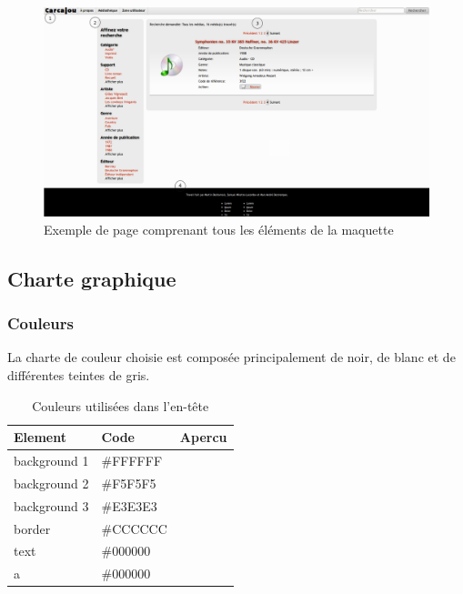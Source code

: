 \documentclass[letter, 11pt]{report}
\begin{document}
\begin{figure}[htbp]
	\begin{center}
		\includegraphics[scale=0.3]{pageType.png}
	\end{center}
	\caption{Exemple de page comprenant tous les éléments de la maquette}
\end{figure}

\subsection{Charte graphique}

\subsubsection{Couleurs}
La charte de couleur choisie est composée principalement de noir, de blanc et de différentes teintes de gris.

\begin{table}[h!tpb]
	\caption{Couleurs utilisées dans l'en-tête}
	\begin{center}
		\begin{tabular}{|l|l|l|}
			\hline
			Element      & Code     & Apercu \\
			\hline
			background 1 & \#FFFFFF & \cellcolor[HTML]{FFFFFF} \\ \hline
			background 2 & \#F5F5F5 & \cellcolor[HTML]{F5F5F5} \\ \hline
			background 3 & \#E3E3E3 & \cellcolor[HTML]{E3E3E3} \\ \hline
			border       & \#CCCCCC & \cellcolor[HTML]{CCCCCC} \\ \hline
			text         & \#000000 & \cellcolor[HTML]{000000} \\ \hline
			a            & \#000000 & \cellcolor[HTML]{000000} \\ \hline
		\end{tabular}
	\end{center}
\end{table}
\end{document}
